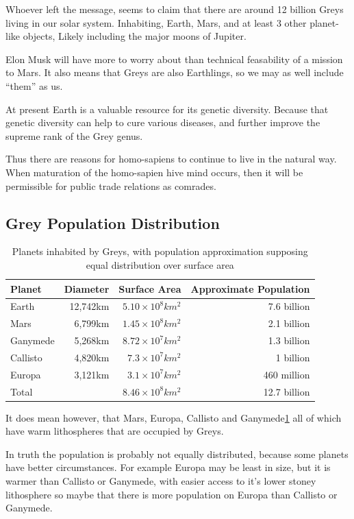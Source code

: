 \documentclass{report}
\begin{document}
Whoever left the message, seems to claim that there are around 12 billion
Greys living in our solar system. Inhabiting, Earth, Mars, and at least 3 other
planet-like objects, Likely including the major moons of Jupiter. 

Elon Musk will have more to worry about than technical feasability of a mission
to Mars. It also means that Greys are also Earthlings, so we may as well include
``them'' as us. 

At present Earth is a valuable resource for its genetic diversity. Because that
genetic diversity can help to cure various diseases, and further improve the
supreme rank of the Grey genus. 

Thus there are reasons for homo-sapiens to continue to live in the natural way.
When maturation of the homo-sapien hive mind occurs, then it will be
permissible for public trade relations as comrades.

\subsection{Grey Population Distribution}
\label{popdist}
\begin{table}
\begin{tabular}{lrrr}
  Planet & Diameter & Surface Area & Approximate Population\\
\midrule
  Earth & 12,742km & $5.10\times10^8km^2$& 7.6 billion\\
  Mars & 6,799km & $1.45\times10^8km^2$& 2.1 billion \\
  Ganymede & 5,268km & $8.72\times10^7km^2$ & 1.3 billion \\
  Callisto & 4,820km & $7.3\times10^7km^2$ & 1 billion\\
  Europa & 3,121km & $3.1\times10^7km^2$& 460 million\\
\midrule
  Total &   & $8.46\times10^8km^2$ & 12.7 billion\\
\end{tabular}
\caption{Planets inhabited by Greys, with population approximation supposing
equal distribution over surface area}
\label{table:planets}
\end{table}

It does mean however, that Mars, Europa, Callisto and 
Ganymede\ref{table:planets} all of which
have warm lithospheres that are occupied by Greys. 

In truth the population is probably not equally distributed, because some
planets have better circumstances. For example Europa may be least in size, but
it is warmer than Callisto or Ganymede, with easier access to it's lower stoney
lithosphere so maybe that there is more population on Europa than Callisto or
Ganymede. 
\end{document}

